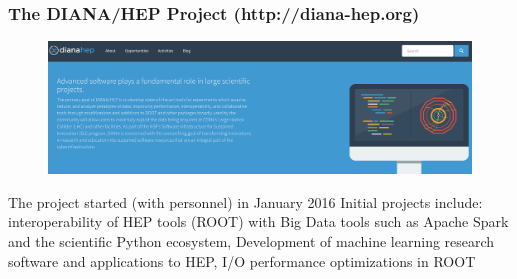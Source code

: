 \begin{frame}
\frametitle{The DIANA/HEP Project (http://diana-hep.org)}

\begin{figure}[htbp]
\begin{center}
\includegraphics[width=1.0\textwidth]{images/20160610-diana-hep-banner.png}
\end{center}
\end{figure}

The project started (with personnel) in January 2016
\vskip 0.15in
Initial projects include: interoperability of HEP tools (ROOT) with Big Data tools such as Apache Spark and the scientific Python ecosystem, Development of machine learning research software and applications to HEP, I/O performance optimizations in ROOT


\end{frame}


